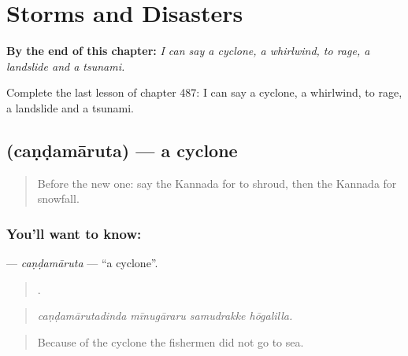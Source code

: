 
\chapter{Storms and Disasters}
\label{ch:ka-storms-and-disasters}

\begin{chapteropening}
\textbf{By the end of this chapter:} \emph{I can say a cyclone, a whirlwind, to rage, a landslide and a tsunami.}

Complete the last lesson of chapter 487: I can say a cyclone, a whirlwind, to rage, a landslide and a tsunami.
\end{chapteropening}

\section[\texorpdfstring{\kn{ಚಂಡಮಾರುತ} (caṇḍamāruta)}{ಚಂಡಮಾರುತ (caṇḍamāruta)}]{ (caṇḍamāruta) — a cyclone}

\label{lesson:KA-C487-candamaruta}



\begin{quote}
Before the new one: say the Kannada for to shroud, then the Kannada for snowfall.
\end{quote}

\subsection*{You'll want to know: }
\textbf{} — \emph{caṇḍamāruta} — \textquotedblleft{}a cyclone\textquotedblright{}.

\begin{quote}
   .
\end{quote}

\begin{quote}
\emph{caṇḍamārutadinda mīnugāraru samudrakke hōgalilla.}
\end{quote}

\begin{quote}
Because of the cyclone the fishermen did not go to sea.
\end{quote}

